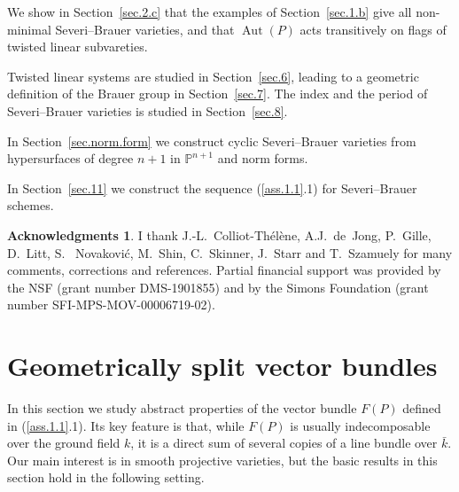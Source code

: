 \documentclass{amsart}
\theoremstyle{definition}
\newtheorem*{ack}{Acknowledgments}      %
\theoremstyle{remark}
\newcommand{\p}[0]{{\mathbb P}}
\newcommand{\aut}[0]{\operatorname{Aut}}
\begin{document}
We show in   Section~\ref{sec.2.c} that the  examples of Section~\ref{sec.1.b}
give all  non-minimal Severi--Brauer varieties, and   that
$\aut(P)$ acts transitively on flags of  twisted linear subvareties.


Twisted linear systems are studied in Section~\ref{sec.6}, leading to a geometric definition of the  Brauer group in Section~\ref{sec.7}.
The index and the period of  Severi--Brauer varieties is studied in Section~\ref{sec.8}.

In  Section~\ref{sec.norm.form}  we construct
 cyclic  Severi--Brauer varieties  from hypersurfaces
of degree $n+1$ in $\p^{n+1}$ and norm forms.

In Section~\ref{sec.11} we construct
the sequence (\ref{ass.1.1}.1) for  Severi--Brauer schemes.



\begin{ack} I thank  J.-L.~Colliot-Th\'el\`ene,  A.J.~de~Jong, P.~Gille, D.~Litt, S.~ Novakovi\'c, M.~Shin, C.~Skinner, J.~Starr  and 
T.~Szamuely  for many
comments, corrections  and references.
 Partial  financial support    was provided  by  the NSF (grant number
DMS-1901855)  and by the Simons Foundation   (grant number SFI-MPS-MOV-00006719-02).
\end{ack}



\section{Geometrically split vector bundles}\label{sec.1}

In this section we study abstract properties of the vector bundle $F(P)$ defined in (\ref{ass.1.1}.1). Its key  feature is that,  while
$F(P)$ is usually indecomposable over the ground field $k$, it is a direct sum of several copies of a line bundle over $\bar k$. 
 Our main interest is in smooth projective varieties, but
the basic results in this section hold in the following setting.
\end{document}

